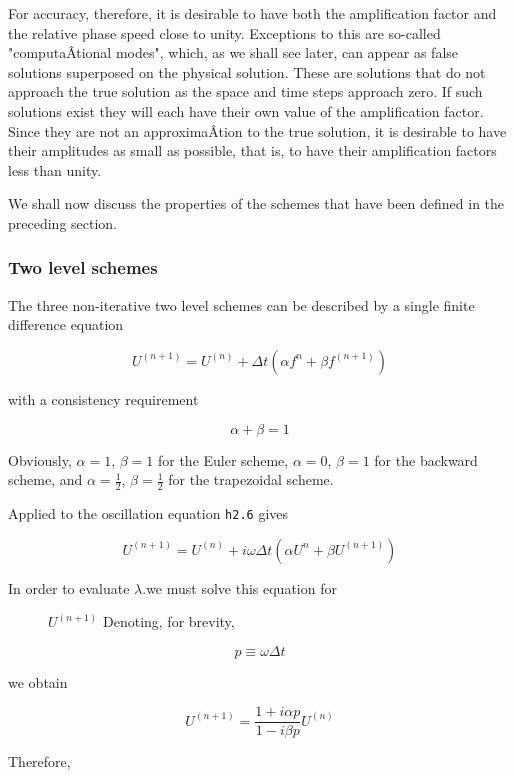 For accuracy, therefore, it is desirable to have both the amplification
factor and the relative phase speed close to unity. Exceptions to this
are so-called "computaÂ­tional modes", which, as we shall see later, can
appear as false solutions superposed on the physical solution. These are
solutions that do not approach the true solution as the space and time
steps approach zero. If such solutions exist they will each have their
own value of the amplification factor. Since they are not an
approximaÂ­tion to the true solution, it is desirable to have their
amplitudes as small as possible, that is, to have their amplification
factors less than unity.

We shall now discuss the properties of the schemes that have been
defined in the preceding section.

\subsubsection{Two level schemes}\label{two-level-schemes-1}

The three non-iterative two level schemes can be described by a single
finite difference equation

\[U^{( n + 1 )} = U^{\left( n \right)} + \Delta t\left( \alpha f^{n} + \beta f^{\left( n + 1 \right)} \right)\]

with a consistency requirement

\[\alpha + \beta = 1\]

Obviously, \(\alpha = 1\), \(\beta = 1\) for the Euler scheme,
\(\alpha = 0\), \(\beta = 1\) for the backward scheme, and
\(\alpha = \frac{1}{2}\), \(\beta = \frac{1}{2}\) for the trapezoidal
scheme.

Applied to the oscillation equation \texttt{h2.6} gives

\[U^{\left( n + 1 \right)} = U^{(n)} + i\omega\Delta t \left( \alpha U^n  + \beta U^{( n + 1 )}\right)\]

\begin{description}
    \item[In order to evaluate \(\lambda\).we must solve this equation for]
    \(U^{\left( n + 1 \right)}\) Denoting, for brevity,
\end{description}

\[p \equiv \omega\Delta t\]

we obtain

\[U^{\left( n + 1 \right)} = \frac{1 + i\alpha p}{1 - i\beta p}U^{\left( n \right)}\]

Therefore,

